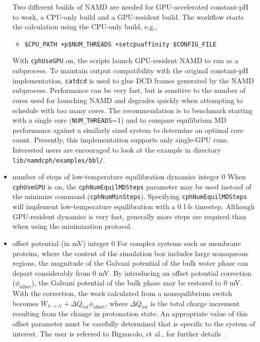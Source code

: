 \begin{itemize}
{Two different builds of NAMD are needed for GPU-accelerated constant-pH 
to work, a CPU-only build and a GPU-resident build. 
The workflow starts the calculation using the CPU-only build, e.g.,
\begin{itemize}
  \item {\tt \$CPU\_PATH +p\$NUM\_THREADS +setcpuaffinity \$CONFIG\_FILE}
\end{itemize}
With {\tt cphUseGPU} on,
the scripts launch GPU-resident NAMD to run as a subprocess. 
To maintain output compatibility with the original constant-pH 
implementation, {\tt catdcd} is used to glue DCD frames generated 
by the NAMD subprocess. Performance can be very fast, but is 
sensitive to the number of cores used for launching NAMD and 
degrades quickly when attempting to schedule with too many cores. 
The recommendation is to benchmark starting with a single core 
({\tt NUM\_THREADS}=1)
and to compare equilibrium MD performance against a similarly sized 
system to determine an optimal core count. 
Presently, this implementation supports only single-GPU runs.
Interested users are encouraged to look at the example
in directory {\tt lib/namdcph/examples/bbl/}.
}

\item {}
{number of steps of low-temperature equilibration dynamics}
{integer}
{0}
{
When {\tt cphUseGPU} is on, the {\tt cphNumEquilMDSteps} parameter may be used
instead of the minimize command ({\tt cphNumMinSteps}). 
Specifying {\tt cphNumEquilMDSteps}
will implement low-temperature equilibration with a 0.1\,fs timestep.
Although GPU-resident dynamics is very fast, generally more steps 
are required than when using the minimization protocol. 
}

\item {}
{ offset potential (in mV) }
{integer}
{0}
{
For complex systems such as membrane proteins,
where the content of the simulation box
includes large nonaqueous regions,
the magnitude of the Galvani potential of the bulk water phase
can depart considerably from 0 mV.
By introducing an offset potential correction ($\phi_{\text{offset}}$),
the Galvani potential of the bulk phase may be restored to 0 mV.
With the correction, the work calculated from a nonequilibrium switch becomes
$W_{\lambda \rightarrow \lambda'}$\,$+$\,${\Delta Q}_{\text{tot}}\phi_{\text{offset}}$,
where ${\Delta Q}_{\text{tot}}$ is the total charge increment resulting
from the change in protonation state.
An appropriate value of this offset parameter must be carefully determined
that is specific to the system of interest.
The user is referred to Bignucolo, et al., for
further details~\cite{Bignucolo_JPhysChemB_2022_v126_p6868}.
}
\end{itemize}

